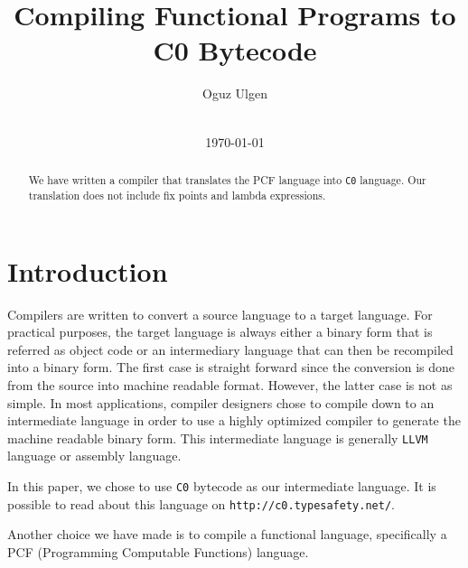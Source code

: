 \documentclass{acm_proc_article-sp}
\newcommand{\ccb}{\texttt{C0} bytecode }
\begin{document}
\title{Compiling Functional Programs to C0 Bytecode}

\author{
\alignauthor
Oguz Ulgen\\
       \\
}

\date{\today}

\maketitle
\begin{abstract}
We have written a compiler that translates the PCF language into \texttt{C0} language. Our translation does not include fix points and lambda expressions.
\end{abstract}



\section{Introduction}
Compilers are written to convert a source language to a target language. For practical purposes, the target language is always either a binary form that is referred as object code or an intermediary language that can then be recompiled into a binary form. The first case is straight forward since the conversion is done from the source into machine readable format. However, the latter case is not as simple. In most applications, compiler designers chose to compile down to an intermediate language in order to use a highly optimized compiler to generate the machine readable binary form. This intermediate language is generally \texttt{LLVM} language or assembly language.

In this paper, we chose to use \ccb as our intermediate language. It is possible to read about this language on \texttt{http://c0.typesafety.net/}.

Another choice we have made is to compile a functional language, specifically a PCF (Programming Computable Functions) language.
\end{document}
